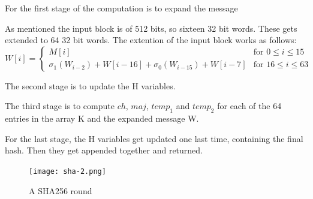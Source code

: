 \documentclass[a4paper, openany]{book}
\begin{document}
\begin{abstact}
For the first stage of the computation is to expand the message

As mentioned the input block is of 512 bits, so sixteen 32 bit words. These gets extended to 64 32 bit words.
The extention of the input block works as follows:
\begin{equation}
  W[i] =
  \begin{cases}
    M[i]  &\text{for } 0 \leq i \leq 15\\
    \sigma_1(W_{i-2}) + W[i-16] + \sigma_0(W_{i-15}) + W[i-7] &\text{for } 16 \leq i \leq 63
  \end{cases}
\end{equation}

The second stage is to update the H variables.

The third stage is to compute \(ch\), \(maj\), \(temp_1\) and \(temp_2\) for each of the 64 entries in the array K and the expanded message W.

For the last stage, the H variables get updated one last time, containing the final hash. Then they get appended together and returned.

\begin{figure}[H]
\centering
\texttt{[image: sha-2.png]}
\caption{A SHA256 round}
\label{fig:sha256round}
\end{figure}

\end{abstact}
\end{document}
